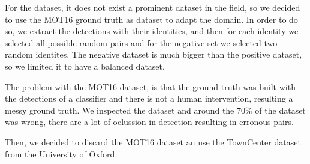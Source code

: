 \documentclass[12pt, a4paper, titlepage,twoside,openright]{article}
\begin{document}
For the dataset, it does not exist a prominent dataset in the field, so we decided to use the MOT16 ground truth as dataset to adapt the domain. In order to do so, we extract the detections with their identities, and then for each identity we selected all possible random pairs and for the negative set we selected two random identites. The negative dataset is much bigger than the positive dataset, so we limited it to have a balanced dataset. 

The problem with the MOT16 dataset, is that the ground truth was built with the detections of a classifier and there is not a human intervention, resulting a messy ground truth. We inspected the dataset and around the $70 \%$ of the dataset was wrong, there are a lot of oclussion in detection resulting in erronous pairs.

Then, we decided to discard the MOT16 dataset an use the TownCenter dataset \cite{townCenter} from the University of Oxford.
\end{document}
